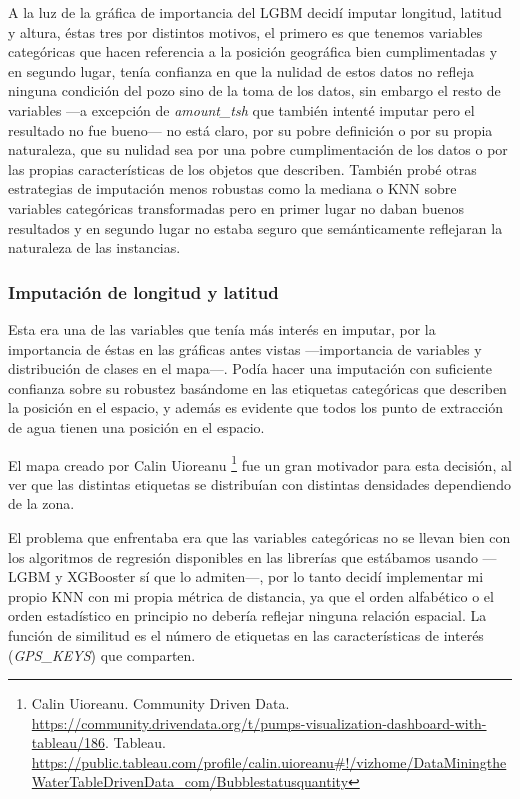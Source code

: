 \documentclass{article}
\newcommand{\img}[2]{
\noindent\makebox[\textwidth][c]{\texttt{[image: imgs/\#1]}}%
}
\begin{document}
A la luz de la gráfica de importancia del LGBM decidí imputar longitud, latitud y altura, éstas tres por distintos motivos, el primero es que tenemos variables categóricas que hacen referencia a la posición geográfica bien cumplimentadas y en segundo lugar, tenía confianza en que la nulidad de estos datos no refleja ninguna condición del pozo sino de la toma de los datos, sin embargo el resto de variables ---a excepción de \textit{amount\_tsh} que también intenté imputar pero el resultado no fue bueno--- no está claro, por su pobre definición o por su propia naturaleza, que su nulidad sea por una pobre cumplimentación de los datos o por las propias características de los objetos que describen. También probé otras estrategias de imputación menos robustas como la mediana o KNN sobre variables categóricas transformadas pero en primer lugar no daban buenos resultados y en segundo lugar no estaba seguro que semánticamente reflejaran la naturaleza de las instancias.

\subsubsection{Imputación de longitud y latitud}

Esta era una de las variables que tenía más interés en imputar, por la importancia de éstas en las gráficas antes vistas ---importancia de variables y distribución de clases en el mapa---. Podía hacer una imputación con suficiente confianza sobre su robustez basándome en las etiquetas categóricas que describen la posición en el espacio, y además es evidente que todos los punto de extracción de agua tienen una posición en el espacio.

El mapa creado por Calin Uioreanu \footnote{Calin Uioreanu. Community Driven Data. \url{https://community.drivendata.org/t/pumps-visualization-dashboard-with-tableau/186}. Tableau. \url{https://public.tableau.com/profile/calin.uioreanu\#!/vizhome/DataMiningtheWaterTableDrivenData_com/Bubblestatusquantity}} fue un gran motivador para esta decisión, al ver que las distintas etiquetas se distribuían con distintas densidades dependiendo de la zona.

\img{map2}{0.5}

El problema que enfrentaba era que las variables categóricas no se llevan bien con los algoritmos de regresión disponibles en las librerías que estábamos usando ---LGBM y XGBooster sí que lo admiten---, por lo tanto decidí implementar mi propio KNN con mi propia métrica de distancia, ya que el orden alfabético o el orden estadístico en principio no debería reflejar ninguna relación espacial. La función de similitud es el número de etiquetas en las características de interés (\textit{GPS\_KEYS}) que comparten. 
\end{document}
